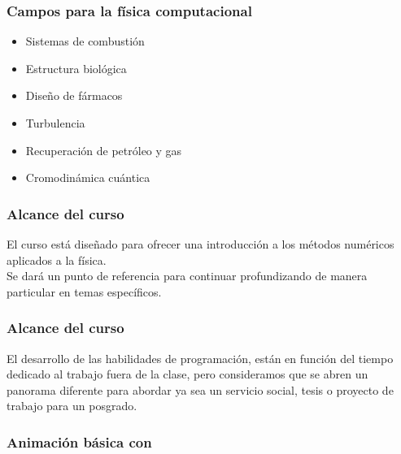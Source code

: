 \documentclass[12pt]{beamer}
\begin{document}
\begin{frame}
\frametitle{Campos para la física computacional}
\begin{multicols}{2}
\begin{itemize}[<+->]
\item[\ding{213}] Sistemas de combustión
\item[\ding{213}] Estructura biológica
\item[\ding{213}] Diseño de fármacos
\item[\ding{213}] Turbulencia
\item[\ding{213}] Recuperación de petróleo y gas
\item[\ding{213}] Cromodinámica cuántica
\end{itemize}
\end{multicols}
\end{frame}
\begin{frame}
\frametitle{Alcance del curso}
El curso está diseñado para ofrecer una introducción a los métodos numéricos aplicados a la física.
\\
\bigskip
\pause
Se dará un punto de referencia para continuar profundizando de manera particular en temas específicos. 
\end{frame}
\begin{frame}
\frametitle{Alcance del curso}
El desarrollo de las habilidades de programación, están en función del tiempo dedicado al trabajo fuera de la clase, pero consideramos que se abren un panorama diferente para abordar ya sea un servicio social, tesis o proyecto de trabajo para un posgrado.
\end{frame}
\begin{frame}[fragile]
\frametitle{Animación básica con \python}
\begin{center}
\end{center}
\end{frame}
\end{document}
